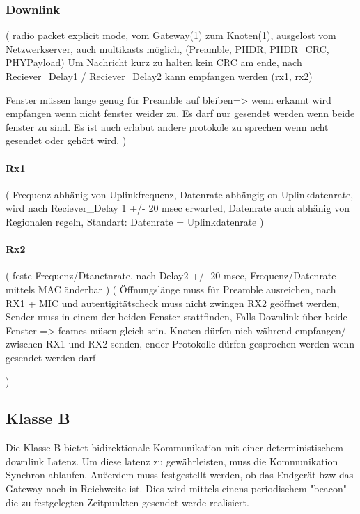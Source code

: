 \documentclass[a4paper,12pt]{article}
\begin{document}
            \subsubsection{Downlink}

                \cite{LoRaSpec}
                (
                    radio packet explicit mode, vom Gateway(1) zum Knoten(1), ausgelöst vom Netzwerkserver, auch multikasts möglich, (Preamble, PHDR, PHDR\_CRC, PHYPayload)
                Um Nachricht kurz zu halten kein CRC am ende, nach Reciever\_Delay1 / Reciever\_Delay2 kann empfangen werden (rx1, rx2) 
                
                Fenster müssen lange genug für Preamble auf bleiben=> wenn erkannt wird empfangen wenn nicht fenster weider zu. Es darf nur gesendet werden wenn beide fenster zu sind.
                Es ist auch erlabut andere protokole zu sprechen wenn ncht gesendet oder gehört wird.
                )
                \paragraph{Rx1}
                    \cite{LoRaSpec}(
                        Frequenz abhänig von Uplinkfrequenz, Datenrate abhängig on Uplinkdatenrate, wird nach Reciever\_Delay 1 +/- 20 msec erwarted, Datenrate auch abhänig von Regionalen regeln, Standart: Datenrate = Uplinkdatenrate
                    )
                \paragraph{Rx2}
                    \cite{LoRaSpec}(
                        feste Frequenz/Dtanetnrate, nach Delay2 +/- 20 msec, Frequenz/Datenrate mittels MAC änderbar
                    )
                    \cite{LoRaSpec}(
                        Öffnungslänge muss für Preamble ausreichen, nach RX1 + MIC und autentigitätscheck muss nicht zwingen RX2 geöffnet werden, Sender muss in einem der beiden Fenster stattfinden, Falls Downlink über beide Fenster => feames müsen gleich sein. Knoten dürfen nich während empfangen/ zwischen RX1 und RX2 senden, ender Protokolle dürfen gesprochen werden wenn gesendet werden darf

                        )
        \subsection{Klasse B}
            Die Klasse B bietet bidirektionale Kommunikation mit einer deterministischem downlink Latenz. Um diese latenz zu gewährleisten, muss die Kommunikation Synchron ablaufen. Außerdem muss festgestellt werden, ob das Endgerät bzw das Gateway noch in Reichweite ist. Dies wird mittels einens periodischem "beacon" die zu festgelegten
            Zeitpunkten gesendet werde realisiert.
\end{document}
